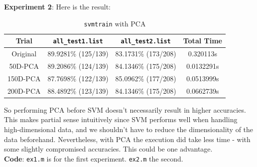 \documentclass{article}
\begin{document}
\newpage
{\bf Experiment 2}: Here is the result: 

\begin{table}[h!]
	\centering
	\caption{{\tt svmtrain} with PCA}\vspace{4pt}
	\begin{tabular}{cccc}\toprule
		Trial & {\tt all\_test1.list} & {\tt all\_test2.list} & Total Time \\ \midrule
		Original & 89.9281\% (125/139) & 83.1731\% (173/208) & 0.320113s \\ 
		50D-PCA & 89.2086\% (124/139) & 84.1346\% (175/208) & 0.0132291s \\
		150D-PCA & 87.7698\% (122/139) & 85.0962\% (177/208) & 0.0513999s \\
		200D-PCA & 88.4892\% (123/139) & 84.1346\% (175/208) & 0.0662739s \\ \bottomrule 
	\end{tabular}
\end{table}

So performing PCA before SVM doesn't necessarily result in higher accuracies. This makes partial
sense intuitively since SVM performs well when handling high-dimensional data, and we shouldn't 
have to reduce the dimensionality of the data beforehand. Nevertheless, with PCA the execution
did take less time - with some slightly compromised accuracies. This could be one advantage. \\

{\bf Code}: {\tt ex1.m} is for the first experiment. {\tt ex2.m} the second. 




\end{document}
